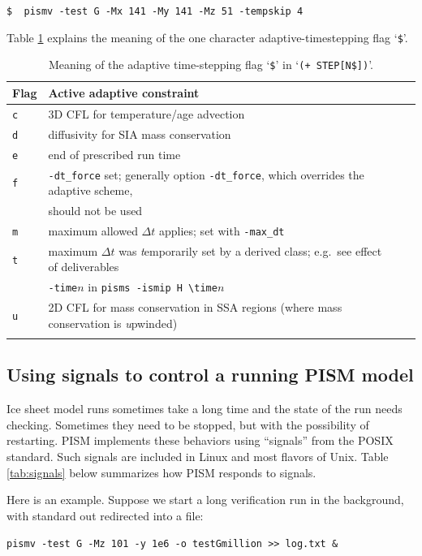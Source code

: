 \documentclass[11pt,final]{amsart}
\begin{document}
\verb|$  pismv -test G -Mx 141 -My 141 -Mz 51 -tempskip 4|

Table \ref{tab:adaptiveflag} explains the meaning of the one character adaptive-timestepping flag `\verb|$|'.

\begin{table}[ht]
\caption{Meaning of the adaptive time-stepping flag `\texttt{\$}' in `\texttt{(+    STEP[N\$])}'.}\label{tab:adaptiveflag}
\begin{tabular}{@{}llll}\hline
\textbf{Flag} & \textbf{Active adaptive constraint} \\ \hline
\verb|c| & 3D CFL for temperature/age advection \cite{BBL} \\
\verb|d| & diffusivity for SIA mass conservation \cite{BBL} \\
\verb|e| & end of prescribed run time \\
\verb|f| & \verb|-dt_force| set; generally option \verb|-dt_force|, which overrides the adaptive scheme, \\
 & should not be used  \\
\verb|m| & maximum allowed $\Delta t$ applies; set with \verb|-max_dt| \\
\verb|t| & maximum $\Delta t$ was \emph{t}emporarily set by a derived class; e.g.~see effect of deliverables \\
 & \verb|-time|$n$ in \verb|pisms -ismip H \time|$n$ \\
\verb|u| & 2D CFL for mass conservation in SSA regions (where mass conservation is \emph{u}pwinded)\\
\hline
\normalsize
\end{tabular}
\end{table}

\subsection{Using signals to control a running PISM model} \label{subsect:signal}  Ice sheet model runs sometimes take a long time and the state of the run needs checking.  Sometimes they need to be stopped, but with the possibility of restarting.  PISM implements these behaviors using ``signals'' from the POSIX standard.  Such signals are included in Linux and most flavors of Unix.  Table \ref{tab:signals} below summarizes how PISM responds to signals.

Here is an example.  Suppose we start a long verification run in the background, with standard out redirected into a file:

\verb|pismv -test G -Mz 101 -y 1e6 -o testGmillion >> log.txt &|
\end{document}

